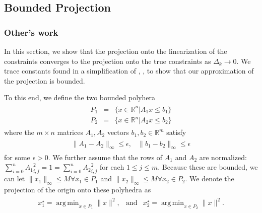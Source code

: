 \documentclass{article}
\theoremstyle{case}
\DeclareMathOperator*{\argmin}{arg\,min}
\newcommand{\dk}{\Delta_k}
\newcommand{\dmax}{\Delta_{\text{max}}}
\newcommand{\naturals}{\mathbb N}
\newcommand{\Rm}{\mathbb R^m}
\newcommand{\Rn}{\mathbb R^n}
\begin{document}




\subsection{Bounded Projection}

\subsubsection{Other's work}

In this section, we show that the projection onto the linearization of the constraints converges to the projection onto the true constraints as $\dk \to 0$.
We trace constants found in a simplification of \cite{dummy:hoffman}, \cite{dummy:continuity_of_inverse}, \cite{dummy:perturbations} to show that our approximation of the projection is bounded.

To this end, we define the two bounded polyhera
\begin{align*}
\begin{array}{ccc}
P_1 &=& \{ x \in \Rn | A_1x\le b_1 \} \\
P_2 &=& \{ x \in \Rn | A_2x\le b_2 \}
\end{array}
\end{align*}
where the $m\times n$ matrices $A_1, A_2$ vectors $b_1, b_2 \in \Rm$  satisfy
\begin{align*}
\begin{array}{cc}
\|A_1 - A_2\|_{\infty} \le \epsilon, & \|b_1 - b_2\|_{\infty} \le \epsilon
\end{array}
\end{align*}
for some $\epsilon > 0$.
We further assume that the rows of $A_1$ and $A_2$ are normalized: $\sum_{i = 0}^n{A_1}_{i,j}^2 = 1 = \sum_{i = 0}^n{A_2}_{i,j}^2$ for each $1 \le j \le m$.
Because these are bounded, we can let $\|x_1\|_{\infty} \le M \forall x_1 \in P_1$ and $\|x_2\|_{\infty} \le M \forall x_2 \in P_2$.
We denote the projection of the origin onto these polyhedra as
\begin{align*}
\begin{array}{ccc}
x_1^{\star} = \argmin_{x\in P_1}\|x\|^2, &\textrm{and} & x_2^{\star} = \argmin_{x\in P_2}\|x\|^2.
\end{array}
\end{align*}
\end{document}
